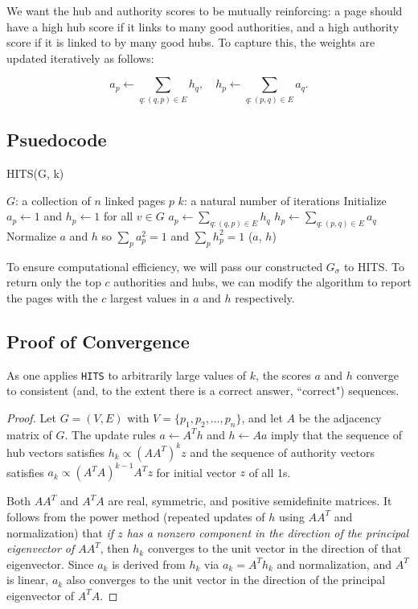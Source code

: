 \documentclass[11pt]{article}
\begin{document}
We want the hub and authority scores to be mutually reinforcing: a page should have a high hub score if it links to many good authorities, and a high authority score if it is linked to by many good hubs.
To capture this, the weights are updated iteratively as follows:

\begin{equation*}
    a_p \gets \sum_{q:(q,p)\in E} h_q, \quad
    h_p \gets \sum_{q:(p,q)\in E} a_q \text{.}
\end{equation*}

\subsection{Psuedocode}
\begin{algorithm}[H]
\caption{HITS(G, k)}
\begin{algorithmic}[1]
\State $G$: a collection of $n$ linked pages $p$
\State $k$: a natural number of iterations
\State Initialize $a_p \gets 1$ and $h_p \gets 1$ for all $v \in G$
        \State $a_p \gets \sum_{q:(q,p)\in E} h_q$
    \EndFor
        \State $h_p \gets \sum_{q:(p,q)\in E} a_q$
    \EndFor
    \State Normalize $a$ and $h$ so $\sum_p a_p^2 = 1$ and $\sum_p h_p^2 = 1$
\EndFor
\State \Return ($a$, $h$)
\end{algorithmic}
\end{algorithm}

To ensure computational efficiency, we will pass our constructed $G_\sigma$ to HITS.
To return only the top $c$ authorities and hubs, we can modify the algorithm to report the pages with the $c$ largest values in $a$ and $h$ respectively.

\subsection{Proof of Convergence}
As one applies \texttt{HITS} to arbitrarily large values of $k$, the scores $a$ and $h$ converge to consistent (and, to the extent there is a correct answer, ``correct") sequences.

\begin{proof}
    Let $G = (V, E)$ with $V = \{p_1, p_2, \dots, p_n\}$, and let $A$ be the adjacency matrix of $G$.
    The update rules $a \gets A^T h$ and $h \gets A a$ imply that the sequence of hub vectors satisfies $h_k \propto (AA^T)^k z$ and the sequence of authority vectors satisfies $a_k \propto (A^T A)^{k-1} A^T z$ for initial vector $z$ of all 1s.

    Both $AA^T$ and $A^T A$ are real, symmetric, and positive semidefinite matrices.
    It follows from the power method (repeated updates of $h$ using $AA^T$ and normalization) that \textit{if $z$ has a nonzero component in the direction of the principal eigenvector of $AA^T$}, then $h_k$ converges to the unit vector in the direction of that eigenvector.
    Since $a_k$ is derived from $h_k$ via $a_k = A^T h_k$ and normalization, and $A^T$ is linear, $a_k$ also converges to the unit vector in the direction of the principal eigenvector of $A^TA$.
\end{proof}
\end{document}
